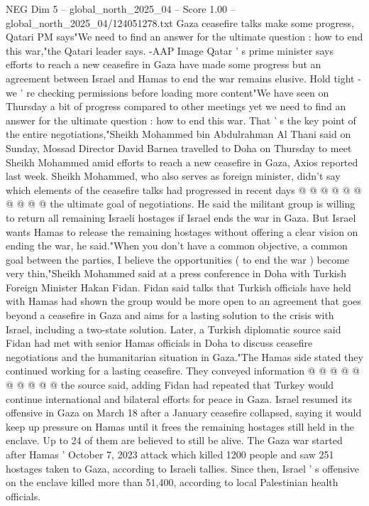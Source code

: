 \begin{textsample}{NEG Dim 5 – global\_north\_2025\_04 – Score 1.00 – global\_north\_2025\_04/124051278.txt}  \label{ex:f5_neg_345}
Gaza ceasefire talks make some progress, Qatari PM says"We need to find an answer for the ultimate question : how to end this war,"the Qatari leader says. -AAP Image Qatar ' s prime minister says efforts to reach a new ceasefire in Gaza have made some progress but an agreement between Israel and Hamas to end the war remains elusive.
Hold tight - we ' re checking permissions before loading more content"We have seen on Thursday a bit of progress compared to other meetings yet we need to find an answer for the ultimate question : how to end this war.
That ' s the key point of the entire negotiations,"Sheikh Mohammed bin Abdulrahman Al Thani said on Sunday, Mossad Director David Barnea travelled to Doha on Thursday to meet Sheikh Mohammed amid efforts to reach a new ceasefire in Gaza, Axios reported last week.
Sheikh Mohammed, who also serves as foreign minister, didn't say which elements of the ceasefire talks had progressed in recent days @ @ @ @ @ @ @ @ @ @ the ultimate goal of negotiations.
He said the militant group is willing to return all remaining Israeli hostages if Israel ends the war in Gaza.
But Israel wants Hamas to release the remaining hostages without offering a clear vision on ending the war, he said."When you don't have a common objective, a common goal between the parties, I believe the opportunities ( to end the war ) become very thin,"Sheikh Mohammed said at a press conference in Doha with Turkish Foreign Minister Hakan Fidan.
Fidan said talks that Turkish officials have held with Hamas had shown the group would be more open to an agreement that goes beyond a ceasefire in Gaza and aims for a lasting solution to the crisis with Israel, including a two-state solution.
Later, a Turkish diplomatic source said Fidan had met with senior Hamas officials in Doha to discuss ceasefire negotiations and the humanitarian situation in Gaza."The Hamas side stated they continued working for a lasting ceasefire.
They conveyed information @ @ @ @ @ @ @ @ @ @ the source said, adding Fidan had repeated that Turkey would continue international and bilateral efforts for peace in Gaza.
Israel resumed its offensive in Gaza on March 18 after a January ceasefire collapsed, saying it would keep up pressure on Hamas until it frees the remaining hostages still held in the enclave.
Up to 24 of them are believed to still be alive.
The Gaza war started after Hamas ' October 7, 2023 attack which killed 1200 people and saw 251 hostages taken to Gaza, according to Israeli tallies.
Since then, Israel ' s offensive on the enclave killed more than 51,400, according to local Palestinian health officials.

\end{textsample}
